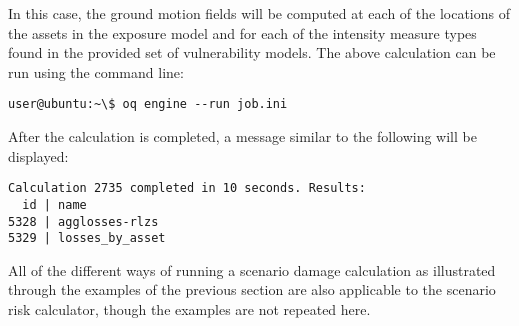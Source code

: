 In this case, the ground motion fields will be computed at each of the
locations of the assets in the exposure model and for each of the intensity
measure types found in the provided set of vulnerability models. The above
calculation can be run using the command line:

\begin{verbatim}
user@ubuntu:~\$ oq engine --run job.ini
\end{verbatim}

After the calculation is completed, a message similar to the following will be
displayed:

\begin{verbatim}
Calculation 2735 completed in 10 seconds. Results:
  id | name
5328 | agglosses-rlzs
5329 | losses_by_asset
\end{verbatim}

All of the different ways of running a scenario damage calculation as
illustrated through the examples of the previous section are also applicable
to the scenario risk calculator, though the examples are not repeated here.
